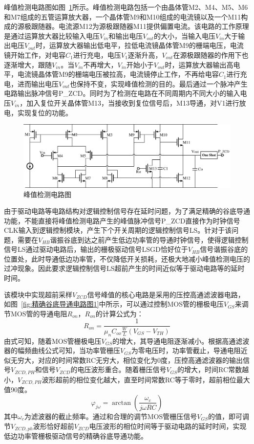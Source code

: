 峰值检测电路图如图~\ref{fig:峰值检测电路图}所示。峰值检测电路包括一个由晶体管M2、M4、M5、M6和M7组成的五管运算放大器，一个晶体管M9和M10组成的电流镜以及一个M11构成的源极跟随器。电流源M12为源极跟随器M11提供偏置电流。该电路的工作原理是通过运算放大器比较输入电压$V_{in}$和输出电压$V_{out}$的大小，当输入电压$V_{in}$大于输出电压$V_{out}$时，运算放大器输出低电平，拉低电流镜晶体管M9的栅端电压，电流镜开始工作，对电容$C_1$进行充电，电压$V_1$逐渐升高，$V_{out}$在源极跟随器的作用下也逐渐增大，跟随$V_{in}$。当$V_{in}$不再增大，$V_{in}$开始小于$V_{out}$时，运算放大器输出高电平，电流镜晶体管M9的栅端电压被拉高，电流镜停止工作，不再给电容$C_1$进行充电，进而输出电压$V_{out}$也保持不变，实现峰值检测的目的。最后通过一个脉冲产生电路输出脉冲信号P\_ZCD。同时为了检测在电路在不同周期内不同大小的输入电压$V_{in}$，加入复位开关晶体管M13，当接收到复位信号后，M13导通，对V1进行放电，实现复位的功能。

\begin{figure}[htbp] 
    \centering
    \includegraphics[width=0.8\linewidth]{figures/峰值检测电路图.pdf}
    \caption{峰值检测电路图}
    \label{fig:峰值检测电路图}
\end{figure}

由于驱动电路等电路结构对逻辑控制信号存在延时问题，为了满足精确的谷底导通功能，不能直接将峰值检测电路产生的峰值脉冲信号P\_ZCD直接作为时钟信号CLK输入到逻辑控制模块，产生下个开关周期的逻辑控制信号LS。针对于该问题，需要在$V_{HB}$谐振谷底到达之前产生低边功率管的导通时钟信号，使得逻辑控制信号LS通过驱动电路后，输出的栅极驱动信号LSGD恰好位于$V_{HB}$信号谐振谷底的位置处，此时导通低边功率管，不仅降低开关损耗，还极大地减小峰值检测电压的过冲现象。因此要求逻辑控制信号LS超前产生的时间近似等于驱动电路等的延时时间。

该模块中实现超前采样$V_{ZCD}$信号峰值的核心电路是采用的压控高通滤波器电路，如图~\ref{fig:精确谷底导通电路图1}中所示，可以通过控制MOS管的栅极电压$V_{GS}$来调节MOS管的导通电阻$R_{on}$，$R_{on}$的计算公式为：
\begin{equation}
    \label{eq:Ron公式}
    R_{on}=\frac{1}{\mu_n C_{ox} \frac{W}{L} (V_{GS} - V_{TH})}
\end{equation}
由式可知，随着MOS管栅极电压$V_{GS}$的增大，其导通电阻逐渐减小。根据高通滤波器的幅频曲线公式可知，当功率管栅压$V_{GS}$为零电压时，功率管截止，导通电阻近似无穷大，对应的时间常数RC无穷大，相位变化为0度，压控高通滤波器的输出信号$V_{ZCD,PH}$和信号$V_{ZCD}$的电压波形重合。随着栅压信号$V_{GS}$的增大，时间RC常数越小，$V_{ZCD,PH}$波形超前的相位变化越大，直至时间常数RC等于零时，超前相位最大值90度。
\begin{equation}
    \label{eq:jw公式}
    \varphi_{j\omega }=\arctan (\frac{\omega_c}{j\omega R C })
\end{equation}
其中$\omega_c$为滤波器的截止频率。通过和合理的调节MOS管栅压信号$V_{GS}$的值，即可调节$V_{ZCD,ph}$波形恰好超前$V_{ZCD}$电压波形的相位时间等于驱动电路的延时时间，实现低边功率管栅极驱动信号的精确谷底导通功能。

